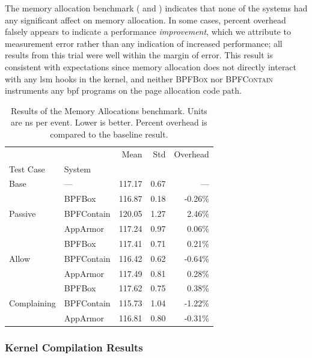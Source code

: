 \documentclass[
  fontsize=12pt,
  titlepage=firstiscover,
  paper=letter,
oneside,
  cleardoublepage=plain,
  parskip=half-,
  DIV=10,
  parindent,
  appendixprefix,
  chapterprefix,
  listof=totoc,
]{scrbook}
\newcommand{\bpfbox}{\textsc{BPFBox}}
\newcommand{\bpfcontain}{\textsc{BPFContain}}
\begin{document}
The memory allocation benchmark ( and
) indicates that none of the systems had any significant affect on
memory allocation. In some cases, percent overhead falsely appears to indicate
a performance \textit{improvement}, which we attribute to measurement error rather than
any indication of increased performance; all results from this trial were well within the
margin of error. This result is consistent with expectations since memory allocation does
not directly interact with any \gls{lsm} hooks in the kernel, and neither \bpfbox{} nor
\bpfcontain{} instruments any \gls{bpf} programs on the page allocation code path.

\begin{table}[ht!]
\centering
\footnotesize
\caption[Results of the Memory Allocations benchmark]{Results of the Memory Allocations benchmark. Units are ns per event. Lower is better. Percent overhead is compared to the baseline result.}
\label{tab:phoronix-memory-allocations}
\begin{tabular}{llrrr}
\toprule
            &          &    Mean &   Std & Overhead \\
Test Case & System &         &       &          \\
\midrule
Base & --- &  117.17 &  0.67 &      --- \\
\cline{1-5}
\multirow{3}{*}{Passive} & BPFBox &  116.87 &  0.18 &  -0.26\% \\
            & BPFContain &  120.05 &  1.27 &   2.46\% \\
            & AppArmor &  117.24 &  0.97 &   0.06\% \\
\cline{1-5}
\multirow{3}{*}{Allow} & BPFBox &  117.41 &  0.71 &   0.21\% \\
            & BPFContain &  116.42 &  0.62 &  -0.64\% \\
            & AppArmor &  117.49 &  0.81 &   0.28\% \\
\cline{1-5}
\multirow{3}{*}{Complaining} & BPFBox &  117.62 &  0.75 &   0.38\% \\
            & BPFContain &  115.73 &  1.04 &  -1.22\% \\
            & AppArmor &  116.81 &  0.80 &  -0.31\% \\
\bottomrule
\end{tabular}
\end{table}
 



\subsubsection{Kernel Compilation Results}
\end{document}
